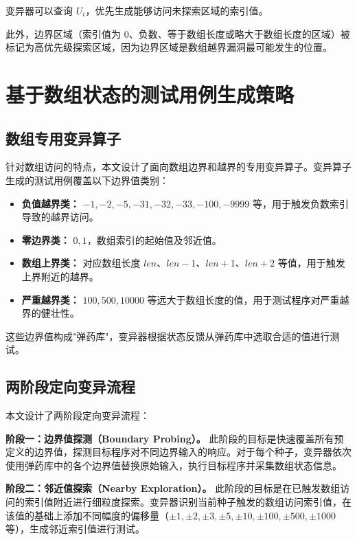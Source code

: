 \documentclass[bachelor]{njupthesis}
\begin{document}
变异器可以查询 $U_i$，优先生成能够访问未探索区域的索引值。

此外，边界区域（索引值为 0、负数、等于数组长度或略大于数组长度的区域）被标记为高优先级探索区域，因为边界区域是数组越界漏洞最可能发生的位置。

\section{基于数组状态的测试用例生成策略}

\subsection{数组专用变异算子}

针对数组访问的特点，本文设计了面向数组边界和越界的专用变异算子。变异算子生成的测试用例覆盖以下边界值类别：

\begin{itemize}
    \item \textbf{负值越界类：} $-1, -2, -5, -31, -32, -33, -100, -9999$ 等，用于触发负数索引导致的越界访问。
    \item \textbf{零边界类：} $0, 1$，数组索引的起始值及邻近值。
    \item \textbf{数组上界类：} 对应数组长度 $len$、$len-1$、$len+1$、$len+2$ 等值，用于触发上界附近的越界。
    \item \textbf{严重越界类：} $100, 500, 10000$ 等远大于数组长度的值，用于测试程序对严重越界的健壮性。
\end{itemize}

这些边界值构成"弹药库"，变异器根据状态反馈从弹药库中选取合适的值进行测试。

\subsection{两阶段定向变异流程}

本文设计了两阶段定向变异流程：

\textbf{阶段一：边界值探测（Boundary Probing）。} 此阶段的目标是快速覆盖所有预定义的边界值，探测目标程序对不同边界输入的响应。对于每个种子，变异器依次使用弹药库中的各个边界值替换原始输入，执行目标程序并采集数组状态信息。

\textbf{阶段二：邻近值探索（Nearby Exploration）。} 此阶段的目标是在已触发数组访问的索引值附近进行细粒度探索。变异器识别当前种子触发的数组访问索引值，在该值的基础上添加不同幅度的偏移量（$\pm 1, \pm 2, \pm 3, \pm 5, \pm 10, \pm 100, \pm 500, \pm 1000$ 等），生成邻近索引值进行测试。
\end{document}
